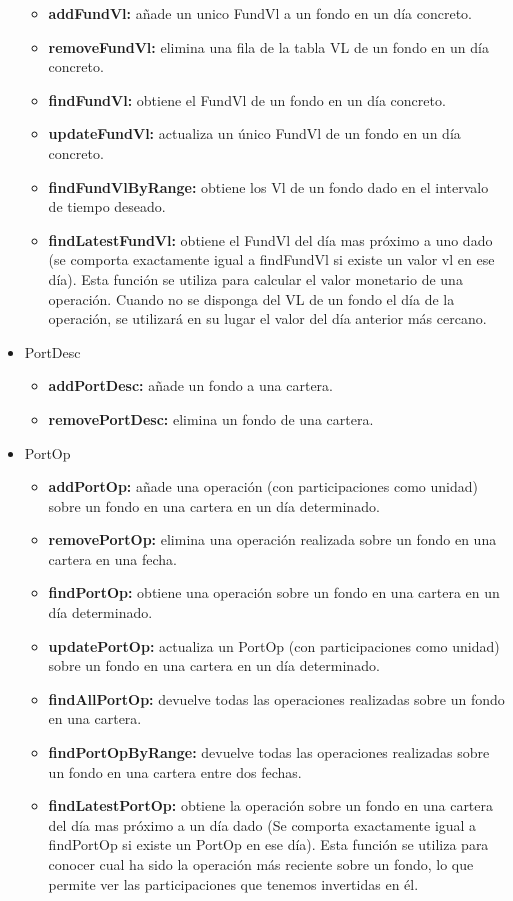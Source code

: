 \documentclass[12pt, a4paper]{article}
\begin{document}
\begin{itemize}
\begin{itemize}
							\item\textbf{addFundVl:} añade un unico FundVl a un fondo en un día concreto.
							\item\textbf{removeFundVl:} elimina una fila de la tabla \gls{VL} de un fondo en un día concreto.
							\item \textbf{findFundVl:} obtiene el FundVl de un fondo en un día concreto.
							\item \textbf{updateFundVl:} actualiza un único FundVl de un fondo en un día concreto.
							\item \textbf{findFundVlByRange:} obtiene los Vl de un fondo dado en el intervalo de tiempo deseado.
							\item \textbf{findLatestFundVl:} obtiene el FundVl del día mas próximo a uno dado (se comporta exactamente igual a findFundVl si existe un valor vl en ese día). Esta función se utiliza para calcular el valor monetario de una operación. Cuando no se disponga del \gls{VL} de un fondo el día de la operación, se utilizará en su lugar el valor del día anterior más cercano.
						\end{itemize}
				
	\item PortDesc
						\begin{itemize}
							\item\textbf{addPortDesc:} añade un fondo a una cartera.
							\item\textbf{removePortDesc:} elimina un fondo de una cartera.
						\end{itemize}
	\item PortOp
						\begin{itemize}
							\item\textbf{addPortOp:} añade una operación (con participaciones como unidad) sobre un fondo en una cartera en un día determinado.
							\item\textbf{removePortOp:} elimina una operación realizada sobre un fondo en una cartera en una fecha.
							\item \textbf{findPortOp:} obtiene una operación sobre un fondo en una cartera en un día determinado.
							\item \textbf{updatePortOp:} actualiza un PortOp (con participaciones como unidad) sobre un fondo en una cartera en un día determinado.
							\item \textbf{findAllPortOp:} devuelve todas las operaciones realizadas sobre un fondo en una cartera.
							\item \textbf{findPortOpByRange:} devuelve todas las operaciones realizadas sobre un fondo en una cartera entre dos fechas.
							\item \textbf{findLatestPortOp:} obtiene la operación sobre un fondo en una cartera del día mas próximo a un día dado (Se comporta exactamente igual a findPortOp si existe un PortOp en ese día). Esta función se utiliza para conocer cual ha sido la operación más reciente sobre un fondo, lo que permite ver las participaciones que tenemos invertidas en él.\\
						\end{itemize}
	
\end{itemize}
\end{document}
